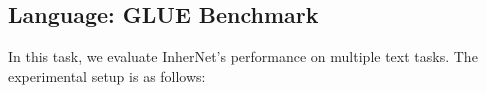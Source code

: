 \documentclass{article} %
\begin{document}




\subsection{Language: GLUE Benchmark}
\label{sec:language}

In this task, we evaluate InherNet's performance on multiple text tasks. The experimental setup is as follows:
\end{document}

